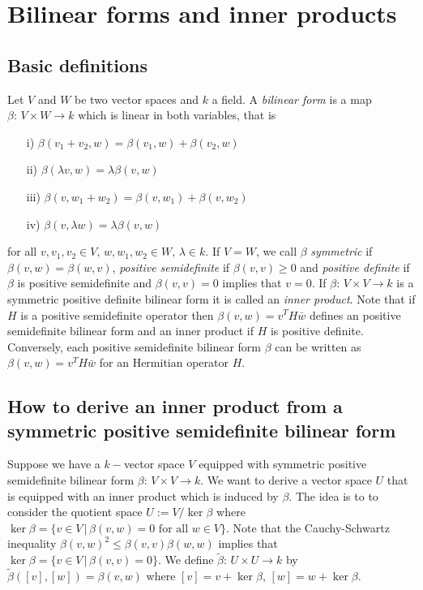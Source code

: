 \section{Bilinear forms and inner products}
\subsection{Basic definitions}

Let $ V $ and $ W $ be two vector spaces and $ k  $ a field. A {\itshape bilinear form} is a map $ \beta: \, V \times W \to k $ which is linear in both variables, that is 
\begin{enumerate}
	\item [i)] $\beta(v_1+v_2,w) = \beta(v_1,w) + \beta(v_2,w)  $
	\item  [ii)]$\beta(\lambda v,w)= \lambda \beta(v,w) $
	\item [iii)]$ \beta(v,w_1+w_2) = \beta(v,w_1)+ \beta(v,w_2) $
	\item [iv)]$ \beta(v,\lambda w) = \lambda\beta(v,w) $
\end{enumerate}
for all $ v,v_1,v_2 \in V, \, w,w_1,w_2 \in W, \, \lambda \in k $. 
If $ V = W $, we call $ \beta $ {\itshape symmetric} if $ \beta(v,w) = \beta(w,v) $, {\itshape positive semidefinite} if 
$ \beta(v,v) \ge 0 $ and {\itshape positive definite} if $ \beta $ is positive semidefinite and $ \beta(v,v)= 0 $ implies that $ v = 0 $. 
If $ \beta: \, V \times V \to k $ is a symmetric positive definite bilinear form it is called an {\itshape inner product}.
Note that if $ H $ is a positive semidefinite operator then $ \beta(v,w) = v^TH\bar{w} $ defines an positive semidefinite bilinear form and an inner product if $ H $ is positive definite. 
Conversely, each positive semidefinite bilinear form $ \beta $ can be written as $ \beta(v,w) = v^TH\bar{w} $ for an Hermitian operator $ H $.

\subsection{How to derive an inner product from a symmetric positive semidefinite bilinear form}\label{App1}
Suppose we have a $ k- $vector space $ V $ equipped with symmetric positive semidefinite bilinear form $ \beta: \, V \times V \to k $. We want to derive a vector space $ U $ that is equipped with an inner product which is induced by $ \beta $. The idea is to to consider the quotient space $ U:=V/\ker\beta $ where $ \ker \beta = \{ v \in V \, | \, \beta(v,w)= 0 \text{ for all } w \in V \} $. Note that the Cauchy-Schwartz inequality $ \beta(v,w)^2 \le \beta(v,v)\beta(w,w) $ implies that 
$ \ker \beta = \{ v \in V \, | \, \beta(v,v)= 0 \} $.
We define $ \tilde{\beta}:  \, U \times U \to k $ by $ \tilde{\beta}([v],[w]) = \beta(v,w) $ where $ [v] = v + \ker\beta, \,$$[w]=w+\ker\beta$.

